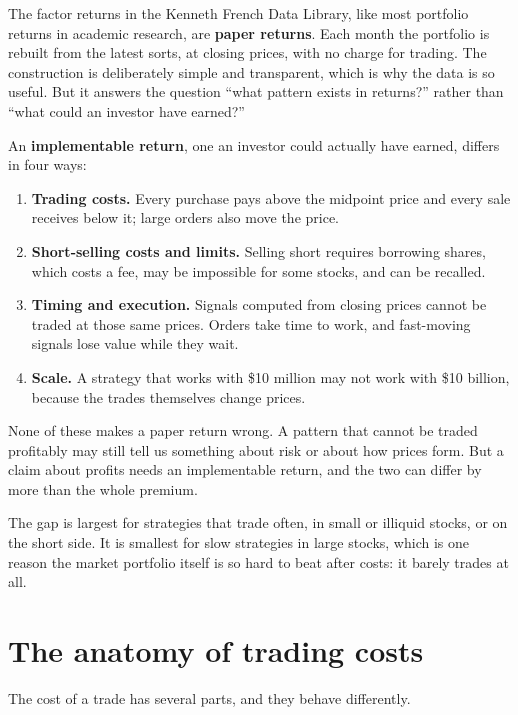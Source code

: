 The factor returns in the Kenneth French Data Library, like most portfolio returns in academic research, are \textbf{paper returns}. Each month the portfolio is rebuilt from the latest sorts, at closing prices, with no charge for trading. The construction is deliberately simple and transparent, which is why the data is so useful. But it answers the question ``what pattern exists in returns?'' rather than ``what could an investor have earned?''

An \textbf{implementable return}, one an investor could actually have earned, differs in four ways:

\begin{enumerate}
  \item \textbf{Trading costs.} Every purchase pays above the midpoint price and every sale receives below it; large orders also move the price.
  \item \textbf{Short-selling costs and limits.} Selling short requires borrowing shares, which costs a fee, may be impossible for some stocks, and can be recalled.
  \item \textbf{Timing and execution.} Signals computed from closing prices cannot be traded at those same prices. Orders take time to work, and fast-moving signals lose value while they wait.
  \item \textbf{Scale.} A strategy that works with \$10 million may not work with \$10 billion, because the trades themselves change prices.
\end{enumerate}

None of these makes a paper return wrong. A pattern that cannot be traded profitably may still tell us something about risk or about how prices form. But a claim about profits needs an implementable return, and the two can differ by more than the whole premium.

The gap is largest for strategies that trade often, in small or illiquid stocks, or on the short side. It is smallest for slow strategies in large stocks, which is one reason the market portfolio itself is so hard to beat after costs: it barely trades at all.

\section{The anatomy of trading costs}
\label{sec:06-anatomy}

The cost of a trade has several parts, and they behave differently.

